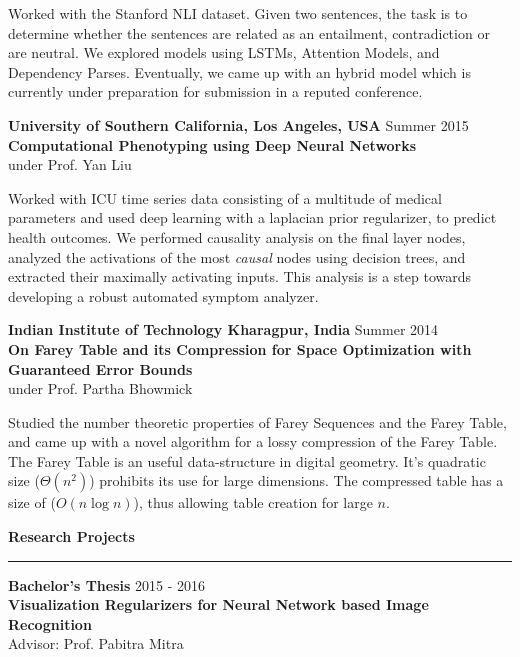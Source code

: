 \documentclass[10pt]{article}
\newcommand{\heading}[1]{
 {\large \textbf{#1}}
  \vspace{0.4em}
  \hrule
  \vspace{0.4em}
}
\newcommand{\EntryGap}{\vspace{0.5cm}}
\newcommand{\SmallEntryGap}{\vspace{0.2cm}}
\newcommand{\indentedpar}[1]{
  \hangindent=1cm \hangafter=0 #1
}
\begin{document}
\SmallEntryGap

\indentedpar{
  Worked with the Stanford NLI dataset. Given two sentences, the task
  is to determine whether the sentences are related as an entailment, contradiction
  or are neutral. We explored models using LSTMs, Attention
  Models, and Dependency Parses. Eventually, we came up with an hybrid model which
  is currently under preparation for submission in a reputed conference.
}

\SmallEntryGap

\textbf{University of Southern California, Los Angeles, USA} \hfill Summer 2015\\
\textbf{Computational Phenotyping using Deep Neural Networks}\\
under Prof. Yan Liu

\SmallEntryGap

\indentedpar{
  Worked with ICU time series data consisting of a multitude of medical parameters
  and used deep learning with a laplacian prior regularizer, to predict health outcomes. We
  performed causality analysis on the final layer nodes, analyzed the activations of 
  the most \emph{causal} nodes using decision trees, and extracted their maximally activating 
  inputs. This analysis is a step towards developing a robust automated symptom analyzer.
}

\SmallEntryGap
\textbf{Indian Institute of Technology Kharagpur, India} \hfill Summer 2014\\
\textbf{On Farey Table and its Compression for Space Optimization with Guaranteed Error Bounds}\\
under Prof. Partha Bhowmick

\SmallEntryGap

\indentedpar{
  Studied the number theoretic properties of Farey Sequences and the
  Farey Table, and came up with a novel algorithm for a lossy compression of the 
  Farey Table. The Farey Table is an useful data-structure in digital geometry.
  It's quadratic size ($\Theta(n^2)$) prohibits its use for large dimensions. The
  compressed table has a size of ($O(n\log n)$), thus allowing table creation for
  large $n$.
}




\EntryGap
\heading{Research Projects}
\SmallEntryGap

\textbf{Bachelor's Thesis} \hfill 2015 - 2016\\
\textbf{Visualization Regularizers for Neural Network based Image Recognition}\\
Advisor: Prof. Pabitra Mitra
\end{document}
